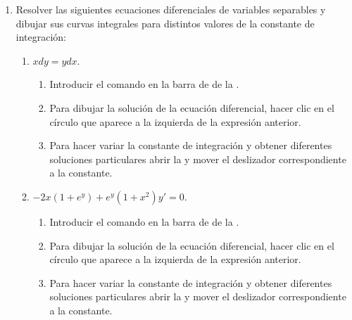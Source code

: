 \begin{enumerate}[leftmargin=*]
\item Resolver las siguientes ecuaciones diferenciales de variables separables y dibujar sus curvas integrales para distintos valores de la constante de integración:
      \begin{enumerate}
      \item $xdy=ydx$.
            \begin{indication}
            \begin{enumerate}
            \item Introducir el comando  en la barra de  de la .
            \item Para dibujar la solución de la ecuación diferencial, hacer clic en el círculo que aparece a la izquierda de la expresión anterior.
            \item Para hacer variar la constante de integración y obtener diferentes soluciones particulares abrir la  y mover el deslizador correspondiente a la constante.
            \end{enumerate}
            \end{indication}

      \item $-2x(1+e^y)+e^y(1+x^{2})y'=0$.
            \begin{indication}
            \begin{enumerate}
            \item Introducir el comando  en la barra de  de la .
            \item Para dibujar la solución de la ecuación diferencial, hacer clic en el círculo que aparece a la izquierda de la expresión anterior.
            \item Para hacer variar la constante de integración y obtener diferentes soluciones particulares abrir la  y mover el deslizador correspondiente a la constante.
            \end{enumerate}
            \end{indication}


\end{enumerate}
\end{enumerate}
